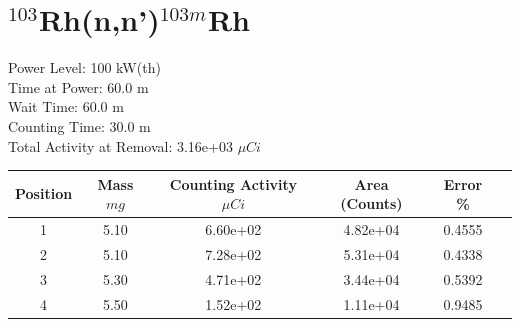 \newpage

\section*{ $^{103}$Rh(n,n')$^{103m}$Rh }

Power Level: 100 kW(th) \\
Time at Power: 60.0 m \\
Wait Time: 60.0 m \\
Counting Time: 30.0 m \\
Total Activity at Removal: 3.16e+03 $\mu Ci$

\begin{table}[h]
\centering
\begin{tabular}{ |c|c|c|c|c|c| }
 \hline
 Position & Mass $mg$ & Counting Activity $\mu Ci$ & Area (Counts) & Error \% \\
 \hline 
 1 & 5.10 & 6.60e+02 & 4.82e+04 & 0.4555 \\ 
\hline
 2 & 5.10 & 7.28e+02 & 5.31e+04 & 0.4338 \\ 
\hline
 3 & 5.30 & 4.71e+02 & 3.44e+04 & 0.5392 \\ 
\hline
 4 & 5.50 & 1.52e+02 & 1.11e+04 & 0.9485 \\ 
\hline
\end{tabular}
\end{table}

